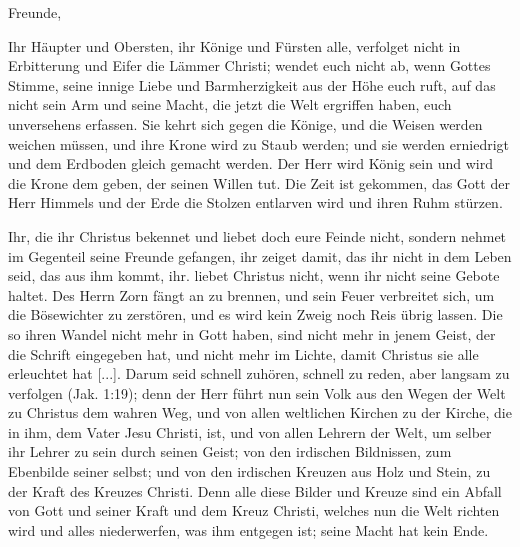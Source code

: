 {
    Freunde,

    \bigskip

    Ihr Häupter und Obersten, ihr Könige und Fürsten alle,
    verfolget nicht in Erbitterung und Eifer die Lämmer Christi; wendet
    euch nicht ab, wenn Gottes Stimme, seine innige Liebe und 
    Barmherzigkeit aus der Höhe euch ruft, auf das nicht sein Arm und
    seine Macht, die jetzt die Welt ergriffen 
    haben, euch unversehens
    erfassen. Sie kehrt sich gegen die Könige, und die Weisen werden
    weichen müssen, und ihre Krone wird zu Staub werden; und sie
    werden erniedrigt und dem Erdboden gleich gemacht werden. Der
    Herr wird König sein und wird die Krone dem geben, der seinen
    Willen tut. Die Zeit ist gekommen, das Gott der Herr Himmels
    und der Erde die Stolzen entlarven wird und ihren Ruhm stürzen.

    Ihr, die ihr Christus bekennet und liebet doch eure Feinde nicht,
    sondern nehmet im Gegenteil seine Freunde gefangen, ihr zeiget
    damit, das ihr nicht in dem Leben seid, das aus ihm kommt, ihr.
    liebet Christus nicht, wenn ihr nicht seine Gebote haltet. Des
    Herrn Zorn fängt an zu brennen, und sein Feuer verbreitet
    sich, um die Bösewichter zu zerstören, und es wird kein Zweig
    noch Reis übrig lassen. Die so ihren Wandel nicht mehr in
    Gott haben, sind nicht mehr in jenem Geist, der die Schrift 
    eingegeben hat, und nicht mehr im Lichte, damit Christus sie alle
    erleuchtet hat [...]. Darum seid schnell zuhören, schnell zu reden,
    aber langsam zu verfolgen (Jak. 1:19); 
    denn der Herr führt nun
    sein Volk aus den Wegen der Welt zu Christus dem wahren
    Weg, und von allen weltlichen Kirchen zu der Kirche, die in ihm,
    dem Vater Jesu Christi, ist, und von allen Lehrern der Welt,
    um selber ihr Lehrer zu sein durch seinen Geist; von den irdischen
    Bildnissen, zum Ebenbilde seiner selbst; und von den irdischen
    Kreuzen aus Holz und Stein, zu der Kraft des Kreuzes Christi.
    Denn alle diese Bilder und Kreuze sind ein Abfall von Gott und
    seiner Kraft und dem Kreuz Christi, welches nun die Welt richten
    wird und alles niederwerfen, was ihm entgegen ist; seine Macht
    hat kein Ende.

}
